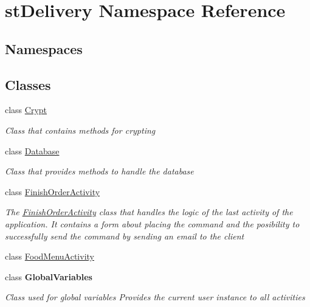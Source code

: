 \hypertarget{namespacest_delivery}{}\section{st\+Delivery Namespace Reference}
\label{namespacest_delivery}
\subsection*{Namespaces}
\begin{DoxyCompactItemize}
\end{DoxyCompactItemize}
\subsection*{Classes}
\begin{DoxyCompactItemize}
\item 
class \hyperlink{classst_delivery_1_1_crypt}{Crypt}
\begin{DoxyCompactList}\small\item\em Class that contains methods for crypting \end{DoxyCompactList}\item 
class \hyperlink{classst_delivery_1_1_database}{Database}
\begin{DoxyCompactList}\small\item\em Class that provides methods to handle the database \end{DoxyCompactList}\item 
class \hyperlink{classst_delivery_1_1_finish_order_activity}{Finish\+Order\+Activity}
\begin{DoxyCompactList}\small\item\em The \hyperlink{classst_delivery_1_1_finish_order_activity}{Finish\+Order\+Activity} class that handles the logic of the last activity of the application. It contains a form about placing the command and the posibility to successfully send the command by sending an email to the client \end{DoxyCompactList}\item 
class \hyperlink{classst_delivery_1_1_food_menu_activity}{Food\+Menu\+Activity}
\item 
class {\bfseries Global\+Variables}
\begin{DoxyCompactList}\small\item\em Class used for global variables Provides the current user instance to all activities \end{DoxyCompactList}\item 

\end{DoxyCompactItemize}
